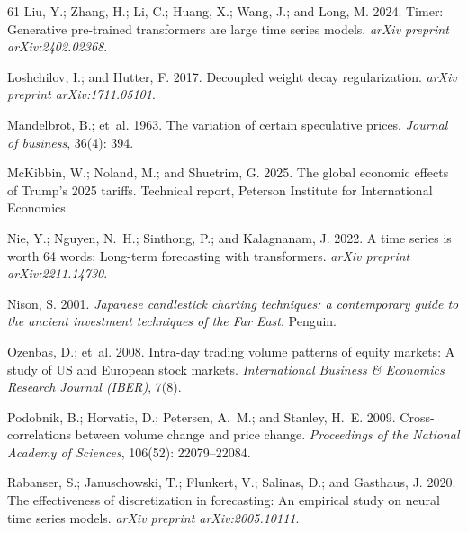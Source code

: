 \documentclass[letterpaper]{article} %
\begin{document}
\begin{thebibliography}{61}
Liu, Y.; Zhang, H.; Li, C.; Huang, X.; Wang, J.; and Long, M. 2024.
\newblock Timer: Generative pre-trained transformers are large time series
  models.
\newblock \emph{arXiv preprint arXiv:2402.02368}.

Loshchilov, I.; and Hutter, F. 2017.
\newblock Decoupled weight decay regularization.
\newblock \emph{arXiv preprint arXiv:1711.05101}.

Mandelbrot, B.; et~al. 1963.
\newblock The variation of certain speculative prices.
\newblock \emph{Journal of business}, 36(4): 394.

McKibbin, W.; Noland, M.; and Shuetrim, G. 2025.
\newblock The global economic effects of Trump's 2025 tariffs.
\newblock Technical report, Peterson Institute for International Economics.

Nie, Y.; Nguyen, N.~H.; Sinthong, P.; and Kalagnanam, J. 2022.
\newblock A time series is worth 64 words: Long-term forecasting with
  transformers.
\newblock \emph{arXiv preprint arXiv:2211.14730}.

Nison, S. 2001.
\newblock \emph{Japanese candlestick charting techniques: a contemporary guide
  to the ancient investment techniques of the Far East}.
\newblock Penguin.

Ozenbas, D.; et~al. 2008.
\newblock Intra-day trading volume patterns of equity markets: A study of US
  and European stock markets.
\newblock \emph{International Business \& Economics Research Journal (IBER)},
  7(8).

Podobnik, B.; Horvatic, D.; Petersen, A.~M.; and Stanley, H.~E. 2009.
\newblock Cross-correlations between volume change and price change.
\newblock \emph{Proceedings of the National Academy of Sciences}, 106(52):
  22079--22084.

Rabanser, S.; Januschowski, T.; Flunkert, V.; Salinas, D.; and Gasthaus, J.
  2020.
\newblock The effectiveness of discretization in forecasting: An empirical
  study on neural time series models.
\newblock \emph{arXiv preprint arXiv:2005.10111}.


\end{thebibliography}
\end{document}
